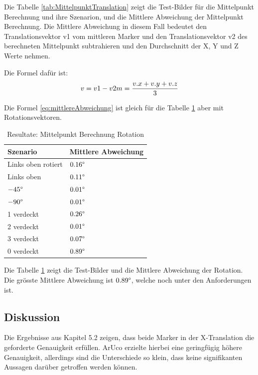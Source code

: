 Die Tabelle \ref{tab:MittelpunktTranslation} zeigt die Test-Bilder für die Mittelpunkt Berechnung und ihre Szenarion, und die Mittlere Abweichung der Mittelpunkt Berechnung.
Die Mittlere Abweichung in diesem Fall bedeutet den Translationsvektor v1 vom mittleren Marker und den Translationsvektor v2 des berechneten Mittelpunkt subtrahieren und den Durchschnitt der X, Y und Z Werte nehmen. 

Die Formel dafür ist: 
\begin{equation}
    v = v1 - v2 \\
    m = \frac{v.x + v.y + v.z}{3}
    \label{eq:mittlereAbweichung}
\end{equation}

Die Formel \ref{eq:mittlereAbweichung} ist gleich für die Tabelle \ref{tab:MittelpunktRotation} aber mit Rotationsvektoren.

\begin{table}[!htb]
    \centering
    \caption{Resultate: Mittelpunkt Berechnung Rotation}
    \label{tab:MittelpunktRotation}
    \begin{tabular}{|l|l|}
            \hline
            Szenario &  Mittlere Abweichung\\
            \hline
            Links oben rotiert & \(0.16\degree\)\\
            \hline
            Links oben & \(0.11\degree\)\\
            \hline
            \(-45 \degree\) & \(0.01\degree\)\\
            \hline
            \(-90 \degree\) & \(0.01\degree\)\\
            \hline
            1 verdeckt & \(0.26\degree\)\\
            \hline
            2 verdeckt & \(0.01\degree\)\\
            \hline
            3 verdeckt & \(0.07\degree\)\\
            \hline
            0 verdeckt & \(0.89\degree\)\\
            \hline
    \end{tabular}
\end{table}

Die Tabelle \ref{tab:MittelpunktRotation} zeigt die Test-Bilder und die Mittlere Abweichung der Rotation.
Die grösste Mittlere Abweichung ist \(0.89\degree\), welche noch unter den Anforderungen ist.


\subsection{Diskussion}
Die Ergebnisse aus Kapitel 5.2 zeigen, dass beide Marker in der X-Translation die geforderte Genauigkeit erfüllen. ArUco erzielte hierbei eine geringfügig höhere Genauigkeit, allerdings sind die Unterschiede so klein, dass keine signifikanten Aussagen darüber getroffen werden können.

